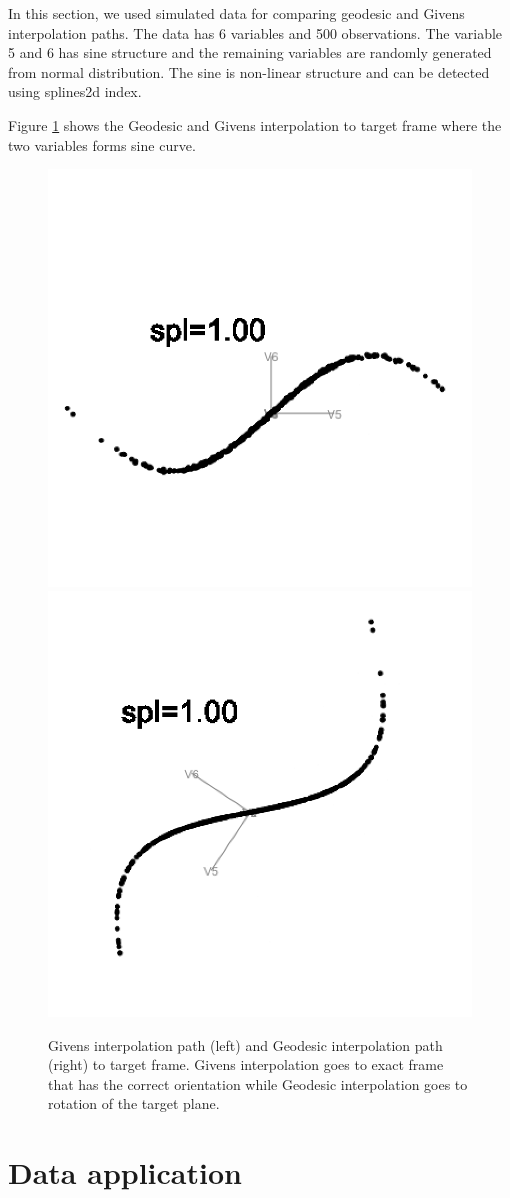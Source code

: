 In this section, we used simulated data for comparing geodesic and Givens interpolation paths. The data has 6 variables and 500 observations. The variable 5 and 6 has sine structure and the remaining variables are randomly generated from normal distribution. The sine is non-linear structure and can be detected using splines2d index.

Figure \ref{fig:compare-interpolations-static} shows the Geodesic and Givens interpolation to target frame where the two variables forms sine curve.

\begin{figure}

{\centering \includegraphics[width=0.5\linewidth]{given_sine} \includegraphics[width=0.5\linewidth]{geodesic_sine} 

}

\caption{Givens interpolation path (left) and Geodesic interpolation path (right) to target frame. Givens interpolation goes to exact frame that has the correct orientation while Geodesic interpolation goes to rotation of the target plane.}\label{fig:compare-interpolations-static}
\end{figure}

\hypertarget{data-application}{%
\section{Data application}\label{data-application}}

